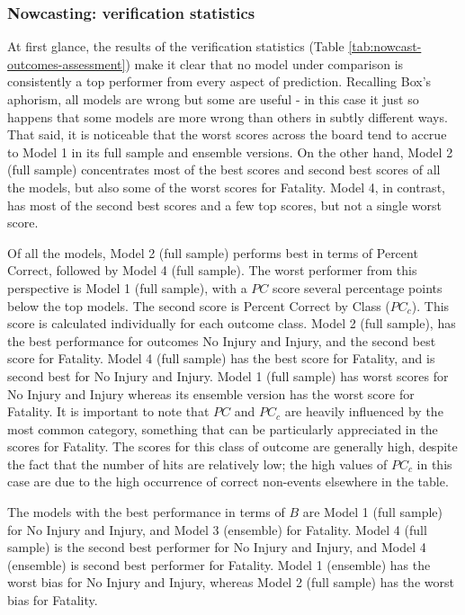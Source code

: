 \documentclass[]{elsarticle} %
\begin{document}
\hypertarget{nowcasting-verification-statistics}{%
\subsubsection{Nowcasting: verification
statistics}\label{nowcasting-verification-statistics}}

At first glance, the results of the verification statistics (Table
\ref{tab:nowcast-outcomes-assessment}) make it clear that no model under
comparison is consistently a top performer from every aspect of
prediction. Recalling Box's aphorism, all models are wrong but some are
useful - in this case it just so happens that some models are more wrong
than others in subtly different ways. That said, it is noticeable that
the worst scores across the board tend to accrue to Model 1 in its full
sample and ensemble versions. On the other hand, Model 2 (full sample)
concentrates most of the best scores and second best scores of all the
models, but also some of the worst scores for Fatality. Model 4, in
contrast, has most of the second best scores and a few top scores, but
not a single worst score.

Of all the models, Model 2 (full sample) performs best in terms of
Percent Correct, followed by Model 4 (full sample). The worst performer
from this perspective is Model 1 (full sample), with a \(PC\) score
several percentage points below the top models. The second score is
Percent Correct by Class (\(PC_c\)). This score is calculated
individually for each outcome class. Model 2 (full sample), has the best
performance for outcomes No Injury and Injury, and the second best score
for Fatality. Model 4 (full sample) has the best score for Fatality, and
is second best for No Injury and Injury. Model 1 (full sample) has worst
scores for No Injury and Injury whereas its ensemble version has the
worst score for Fatality. It is important to note that \(PC\) and
\(PC_c\) are heavily influenced by the most common category, something
that can be particularly appreciated in the scores for Fatality. The
scores for this class of outcome are generally high, despite the fact
that the number of hits are relatively low; the high values of \(PC_c\)
in this case are due to the high occurrence of correct non-events
elsewhere in the table.

The models with the best performance in terms of \(B\) are Model 1 (full
sample) for No Injury and Injury, and Model 3 (ensemble) for Fatality.
Model 4 (full sample) is the second best performer for No Injury and
Injury, and Model 4 (ensemble) is second best performer for Fatality.
Model 1 (ensemble) has the worst bias for No Injury and Injury, whereas
Model 2 (full sample) has the worst bias for Fatality.
\end{document}
